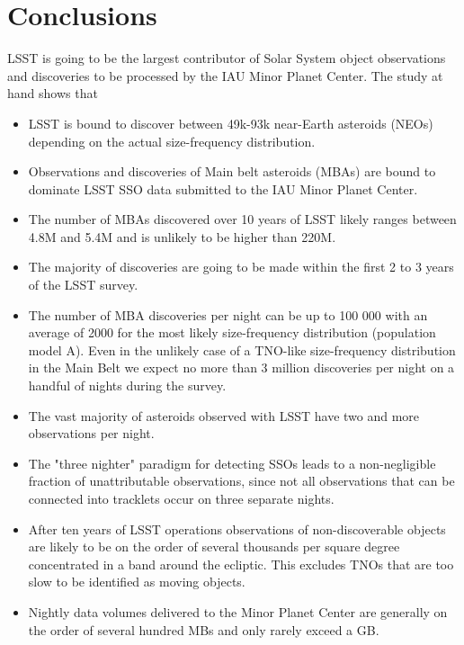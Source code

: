 \section{Conclusions} \label{sec:conclusions}

LSST is going to be the largest contributor of Solar System object observations and discoveries to be processed by the \gls{IAU} Minor Planet \gls{Center}.
The study at hand shows that
\begin{itemize}
\item \gls{LSST} is bound to discover between 49k-93k near-Earth asteroids (NEOs) depending on the actual size-frequency distribution.
\item Observations and discoveries of Main belt asteroids (MBAs) are bound to dominate \gls{LSST} \gls{SSO} data submitted to the \gls{IAU} Minor Planet \gls{Center}.
\item The number of MBAs discovered over 10 years of \gls{LSST} likely ranges between 4.8M and 5.4M and is unlikely to be higher than 220M. 
\item The majority of discoveries are going to be made within the first 2 to 3 years of the \gls{LSST} survey.
\item The number of \gls{MBA} discoveries per night can be up to 100 000 with an average of 2000 for the most likely size-frequency distribution (population model A). Even in the unlikely case of a \gls{TNO}-like size-frequency distribution in the Main Belt we expect no more than 3 million discoveries per night on a handful of nights during the survey.
\item The vast majority of asteroids observed with \gls{LSST} have two and more observations per night.  
\item The "three nighter" paradigm for detecting SSOs leads to a non-negligible fraction of unattributable observations, since not all observations that can be connected into tracklets occur on three separate nights. 
\item After ten years of \gls{LSST} operations observations of non-discoverable objects are likely to be on the order of several thousands per square degree concentrated in a band around the ecliptic. This excludes TNOs that are too slow to be identified as moving objects. 
\item Nightly data volumes delivered to the Minor Planet \gls{Center} are generally on the order of several hundred MBs and only rarely exceed a \gls{GB}.
\end{itemize}
